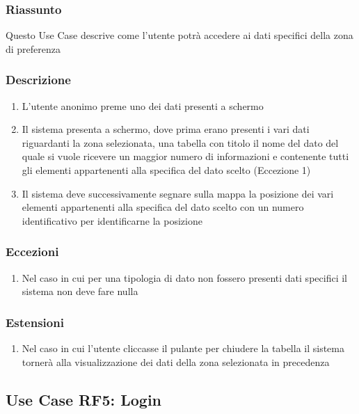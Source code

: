         \subsubsection{Riassunto}
            Questo Use Case descrive come l'utente potrà accedere ai dati specifici della zona di preferenza
        \subsubsection{Descrizione}
            \begin{enumerate}
                \item L'utente anonimo preme uno dei dati presenti a schermo
                \item Il sistema presenta a schermo, dove prima erano presenti i vari dati riguardanti la zona selezionata, una tabella con titolo il nome del dato del quale si vuole ricevere un maggior numero di informazioni e contenente tutti gli elementi appartenenti alla specifica del dato scelto (Eccezione 1)
                \item Il sistema deve successivamente segnare sulla mappa la posizione dei vari elementi appartenenti alla specifica del dato scelto con un numero identificativo per identificarne la posizione
            \end{enumerate}
        \subsubsection{Eccezioni}
            \begin{enumerate}
                \item Nel caso in cui per una tipologia di dato non fossero presenti dati specifici il sistema non deve fare nulla
            \end{enumerate}
        \subsubsection{Estensioni}
            \begin{enumerate}
                \item Nel caso in cui l'utente cliccasse il pulante per chiudere la tabella il sistema tornerà alla visualizzazione dei dati della zona selezionata in precedenza
            \end{enumerate}

    \subsection{Use Case RF5: Login}

